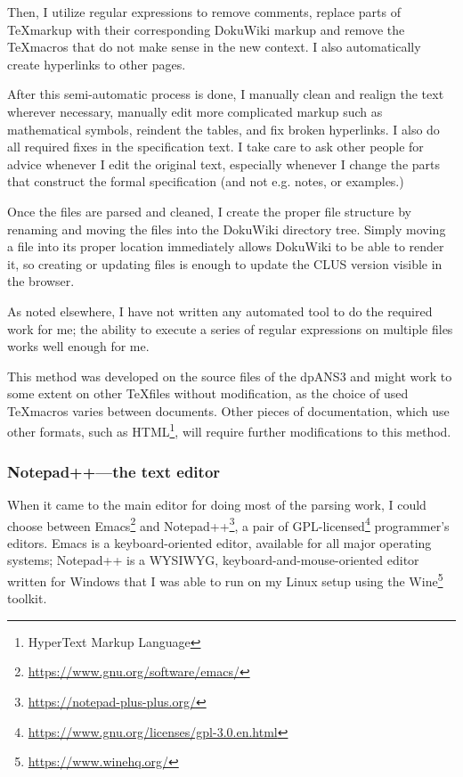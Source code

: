 Then, I utilize regular expressions to remove comments, replace parts of \TeX markup with their corresponding Doku\-Wiki markup and remove the \TeX macros that do not make sense in the new context. I also automatically create hyperlinks to other pages.

After this semi-automatic process is done, I manually clean and realign the text wherever necessary, manually edit more complicated markup such as mathematical symbols, reindent the tables, and fix broken hyperlinks. I also do all required fixes in the specification text. I take care to ask other people for advice whenever I edit the original text, especially whenever I change the parts that construct the formal specification (and not e.g. notes, or examples.)

Once the files are parsed and cleaned, I create the proper file structure by renaming and moving the files into the DokuWiki directory tree. Simply moving a file into its proper location immediately allows DokuWiki to be able to render it, so creating or updating files is enough to update the CLUS version visible in the browser.

As noted elsewhere, I have not written any automated tool to do the required work for me; the ability to execute a series of regular expressions on multiple files works well enough for me.

This method was developed on the source files of the dpANS3 and might work to some extent on other \TeX files without modification, as the choice of used \TeX macros varies between documents. Other pieces of documentation, which use other formats, such as HTML\footnote{HyperText Markup Language}, will require further modifications to this method.

\subsubsection{Notepad++---the text editor}

When it came to the main editor for doing most of the parsing work, I could choose between Emacs\footnote{\url{https://www.gnu.org/software/emacs/}} and Note\-pad++\footnote{\url{https://notepad-plus-plus.org/}}, a pair of GPL-licensed\footnote{\url{https://www.gnu.org/licenses/gpl-3.0.en.html}} programmer's editors. Emacs is a keyboard-oriented editor, available for all major operating systems; Notepad++ is a WYSIWYG, keyboard-and-mouse-oriented editor written for Windows that I was able to run on my Linux setup using the Wine\footnote{\url{https://www.winehq.org/}} toolkit.

